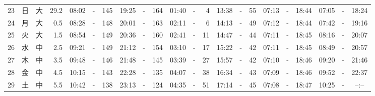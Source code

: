 \documentclass[12pt,a4j]{jsarticle}
\begin{document}
\begin{table}[htbp]
\begin{center}
{\begin{tabular}{|rc|cr|ccrccr|ccrccr|ccc|ccc|}
23 & 日 & 大 & 29.2 &  08:02 &-& 145 &  19:25 &-& 164 &  01:40 &-&   4 &  13:38 &-&  55 & 07:13 & -& 18:44 & 07:05 & -& 18:24 \\
24 & 月 & 大 &  0.5 &  08:28 &-& 148 &  20:01 &-& 163 &  02:11 &-&   6 &  14:13 &-&  49 & 07:12 & -& 18:44 & 07:42 & -& 19:16 \\
25 & 火 & 大 &  1.5 &  08:54 &-& 149 &  20:36 &-& 160 &  02:41 &-&  11 &  14:47 &-&  44 & 07:11 & -& 18:45 & 08:16 & -& 20:07 \\
26 & 水 & 中 &  2.5 &  09:21 &-& 149 &  21:12 &-& 154 &  03:10 &-&  17 &  15:22 &-&  42 & 07:11 & -& 18:45 & 08:49 & -& 20:57 \\
27 & 木 & 中 &  3.5 &  09:48 &-& 146 &  21:48 &-& 145 &  03:39 &-&  27 &  15:57 &-&  42 & 07:10 & -& 18:46 & 09:20 & -& 21:46 \\
28 & 金 & 中 &  4.5 &  10:15 &-& 143 &  22:28 &-& 135 &  04:07 &-&  38 &  16:34 &-&  43 & 07:09 & -& 18:46 & 09:52 & -& 22:37 \\
29 & 土 & 中 &  5.5 &  10:42 &-& 138 &  23:13 &-& 124 &  04:35 &-&  51 &  17:14 &-&  45 & 07:08 & -& 18:47 & 10:25 & -& --:-- \\
   \hline
   \end{tabular}}
   \end{center}
\end{table}
\newpage
\end{document}
